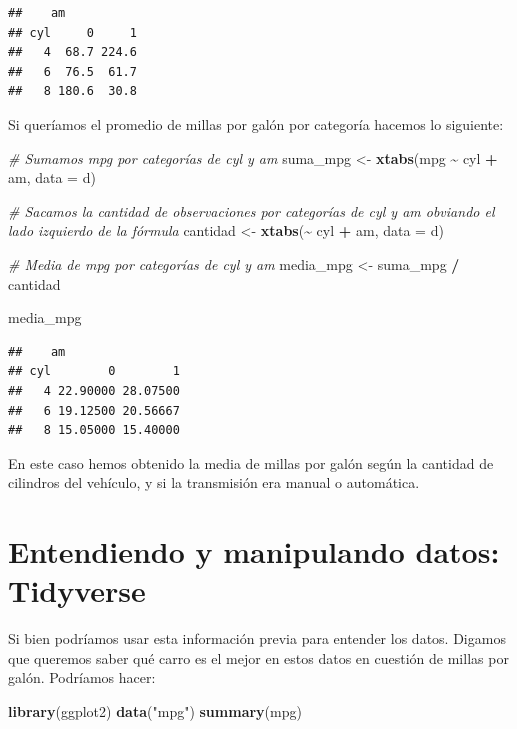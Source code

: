 \documentclass[
]{article}
\newenvironment{Shaded}{\begin{snugshade}}{\end{snugshade}}
\newcommand{\AttributeTok}[1]{\textcolor[rgb]{0.13,0.29,0.53}{#1}}
\newcommand{\CommentTok}[1]{\textcolor[rgb]{0.56,0.35,0.01}{\textit{#1}}}
\newcommand{\FunctionTok}[1]{\textcolor[rgb]{0.13,0.29,0.53}{\textbf{#1}}}
\newcommand{\NormalTok}[1]{#1}
\newcommand{\OtherTok}[1]{\textcolor[rgb]{0.56,0.35,0.01}{#1}}
\newcommand{\SpecialCharTok}[1]{\textcolor[rgb]{0.81,0.36,0.00}{\textbf{#1}}}
\newcommand{\StringTok}[1]{\textcolor[rgb]{0.31,0.60,0.02}{#1}}
\begin{document}
\begin{verbatim}
##    am
## cyl     0     1
##   4  68.7 224.6
##   6  76.5  61.7
##   8 180.6  30.8
\end{verbatim}

Si queríamos el promedio de millas por galón por categoría hacemos lo
siguiente:

\begin{Shaded}
\begin{Highlighting}[]
\CommentTok{\# Sumamos mpg por categorías de cyl y am}
\NormalTok{suma\_mpg }\OtherTok{\textless{}{-}} \FunctionTok{xtabs}\NormalTok{(mpg }\SpecialCharTok{\textasciitilde{}}\NormalTok{ cyl }\SpecialCharTok{+}\NormalTok{ am, }\AttributeTok{data =}\NormalTok{ d)}

\CommentTok{\# Sacamos la cantidad de observaciones por categorías de cyl y am obviando el lado izquierdo de la fórmula}
\NormalTok{cantidad }\OtherTok{\textless{}{-}} \FunctionTok{xtabs}\NormalTok{(}\SpecialCharTok{\textasciitilde{}}\NormalTok{ cyl }\SpecialCharTok{+}\NormalTok{ am, }\AttributeTok{data =}\NormalTok{ d)}

\CommentTok{\# Media de mpg por categorías de cyl y am}
\NormalTok{media\_mpg }\OtherTok{\textless{}{-}}\NormalTok{ suma\_mpg }\SpecialCharTok{/}\NormalTok{ cantidad}

\NormalTok{media\_mpg}
\end{Highlighting}
\end{Shaded}

\begin{verbatim}
##    am
## cyl        0        1
##   4 22.90000 28.07500
##   6 19.12500 20.56667
##   8 15.05000 15.40000
\end{verbatim}

En este caso hemos obtenido la media de millas por galón según la
cantidad de cilindros del vehículo, y si la transmisión era manual o
automática.

\section{Entendiendo y manipulando datos:
Tidyverse}\label{entendiendo-y-manipulando-datos-tidyverse}

Si bien podríamos usar esta información previa para entender los datos.
Digamos que queremos saber qué carro es el mejor en estos datos en
cuestión de millas por galón. Podríamos hacer:

\begin{Shaded}
\begin{Highlighting}[]
\FunctionTok{library}\NormalTok{(ggplot2)}
\FunctionTok{data}\NormalTok{(}\StringTok{"mpg"}\NormalTok{)}
\FunctionTok{summary}\NormalTok{(mpg)}
\end{Highlighting}
\end{Shaded}
\end{document}
